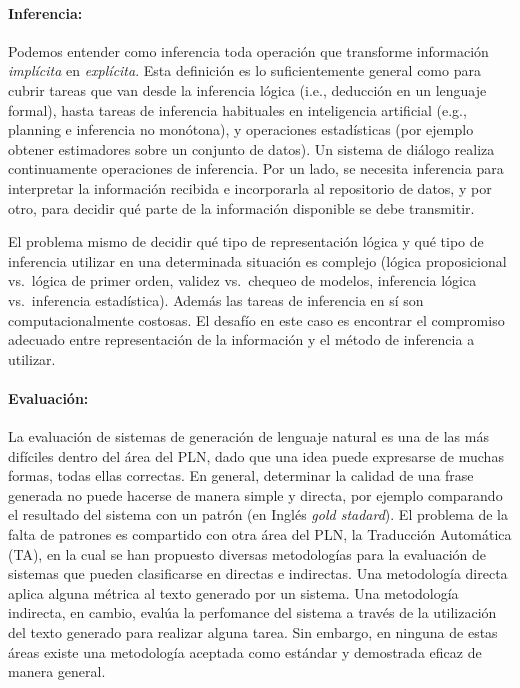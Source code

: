 
\paragraph{Inferencia:} Podemos entender como
inferencia toda operaci\'on que transforme informaci\'on \textit{impl\'icita} en
\textit{expl\'icita}.  Esta definici\'on es lo suficientemente general 
como para cubrir tareas que van desde la inferencia l\'ogica (i.e., deducci\'on 
en un lenguaje formal), hasta tareas de inferencia habituales en inteligencia
artificial (e.g., planning e inferencia no mon\'otona), y operaciones estad\'isticas (por
ejemplo obtener estimadores sobre un conjunto de datos).  Un sistema de
di\'alogo realiza continuamente operaciones de inferencia. Por un lado, 
se necesita inferencia para
interpretar la informaci\'on recibida e incorporarla al repositorio de datos,
y por otro, para decidir qu\'e parte de la informaci\'on disponible se debe
transmitir.

  El problema mismo de decidir qu\'e tipo de representaci\'on l\'ogica y qu\'e
tipo de inferencia utilizar  en una determinada situaci\'on  es complejo
(l\'ogica proposicional vs.\ l\'ogica de primer
orden, validez vs.\ chequeo de modelos, inferencia l\'ogica vs.\ inferencia
estad\'istica). Adem\'as las
tareas de inferencia en s\'i son computacionalmente costosas.  El desaf\'io en
este caso es encontrar el compromiso adecuado entre representaci\'on de la
informaci\'on y el m\'etodo de inferencia a utilizar.

\paragraph{Evaluaci\'on:} La evaluaci\'on de sistemas de generaci\'on de
lenguaje natural es una de las m\'as dif\'iciles dentro del \'area del PLN, dado
que una idea puede expresarse de muchas formas, todas ellas correctas. En
general, determinar la calidad de una frase generada no puede hacerse de manera
simple y directa, por ejemplo comparando el resultado del sistema con un
patr\'on (en Ingl\'es \emph{gold stadard}). El problema de la falta de patrones es
compartido con otra \'area del PLN, la Traducci\'on Autom\'atica (TA), en la
cual se han propuesto diversas metodolog\'ias para la evaluaci\'on de sistemas 
que pueden clasificarse en directas e indirectas. 
Una metodolog\'ia directa aplica alguna m\'etrica al texto generado por un
sistema. Una metodolog\'ia indirecta, en cambio, eval\'ua la perfomance del 
sistema a trav\'es de la utilizaci\'on del texto generado para realizar alguna tarea. Sin
embargo, en ninguna de estas \'areas existe una metodolog\'ia aceptada como
est\'andar y demostrada eficaz de manera general.


